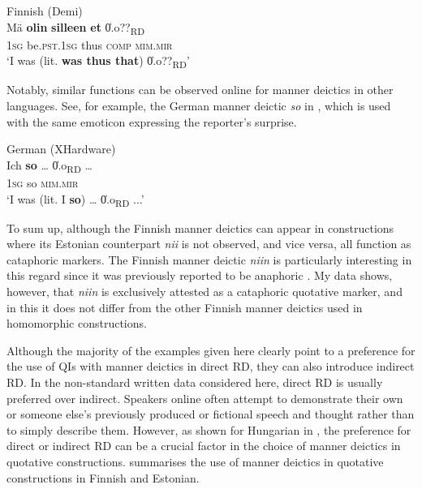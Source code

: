 \documentclass[output=paper,colorlinks,citecolor=brown]{langscibook}
\begin{document}
\ea\label{ex:teptiuk:10} {Finnish (Demi)}\\
\gll Mä \textbf{olin} \textbf{silleen} \textbf{et} \|0.o??\|\textsubscript{RD}\\
 \textsc{1sg} be\textsc{.pst.1sg} thus \textsc{comp} {\db}\textsc{mim.mir}\\
\glt ‘I was (lit. \textbf{was thus that}) \|0.o??\|\textsubscript{RD}’
\z

Notably, similar functions can be observed online for manner deictics in other languages. See, for example, the German manner deictic \textit{so} in , which is used with the same emoticon expressing the reporter’s surprise.

\ea\label{ex:teptiuk:11} {German (XHardware)}\\
\gll Ich \textbf{so} … \|0.o\|\textsubscript{RD} …\\
 1\textsc{sg} so {} {\db}\textsc{mim.mir}\\
\glt ‘I was (lit. I \textbf{so}) … \|0.o\|\textsubscript{RD} ...’\\
 \z

To sum up, although the Finnish manner deictics can appear in constructions where its Estonian counterpart \textit{nii} is not observed, and vice versa, all function as cataphoric markers. The Finnish manner deictic \textit{niin} is particularly interesting in this regard since it was previously reported to be anaphoric \citep[160]{König2017}. My data shows, however, that \textit{niin} is exclusively attested as a cataphoric quotative marker, and in this it does not differ from the other Finnish manner deictics used in homomorphic constructions.

Although the majority of the examples given here clearly point to a preference for the use of QIs with manner deictics in direct RD, they can also introduce indirect RD. In the non-standard written data considered here, direct RD is usually preferred over indirect. Speakers online often attempt to demonstrate their own or someone else’s previously produced or fictional speech and thought rather than to simply describe them. However, as shown for Hungarian in , the preference for direct or indirect RD can be a crucial factor in the choice of manner deictics in quotative constructions.  summarises the use of manner deictics in quotative constructions in Finnish and Estonian.
\end{document}

